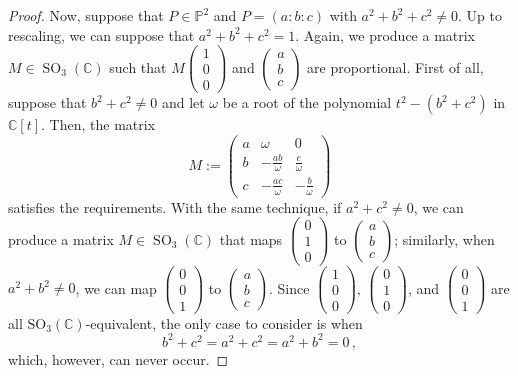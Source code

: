 \documentclass{amsart}
\theoremstyle{plain}
\theoremstyle{definition}
\newcommand{\C}{\mathbb{C}}
\newcommand{\p}{\mathbb{P}}
\newcommand{\SO}{\operatorname{SO}}
\begin{document}
\begin{proof}
Now, suppose that $P \in \p^2$ and $P = (a:b:c)$ with $a^2 + b^2 + c^2 \neq 0$.
Up to rescaling, we can suppose that $a^2 + b^2 + c^2 = 1$.
Again, we produce a matrix $M \in \SO_3(\C)$ such that $M \left(\begin{smallmatrix} 1 \\ 0 \\ 0 \end{smallmatrix}\right)$ and $\left(\begin{smallmatrix} a \\ b \\ c \end{smallmatrix}\right)$ are proportional.
First of all, suppose that $b^2 + c^2 \neq 0$ and let $\omega$ be a root of the polynomial $t^2 - (b^2 + c^2)$ in $\C[t]$.
Then, the matrix
%
\[
  M :=
  \begin{pmatrix}
    a & \omega & 0 \\
    b & -\frac{ab}{\omega} & \frac{c}{\omega} \\
    c & -\frac{ac}{\omega} & -\frac{b}{\omega}
  \end{pmatrix}
\]
%
satisfies the requirements.
With the same technique, if $a^2 + c^2 \neq 0$, we can produce a matrix $M \in \SO_3(\C)$ that maps $\left(\begin{smallmatrix} 0 \\ 1 \\ 0 \end{smallmatrix}\right)$ to $\left(\begin{smallmatrix} a \\ b \\ c \end{smallmatrix}\right)$; similarly, when $a^2 + b^2 \neq 0$, we can map $\left(\begin{smallmatrix} 0 \\ 0 \\ 1 \end{smallmatrix}\right)$ to $\left(\begin{smallmatrix} a \\ b \\ c \end{smallmatrix}\right)$.
Since $\left(\begin{smallmatrix} 1 \\ 0 \\ 0 \end{smallmatrix}\right)$, $\left(\begin{smallmatrix} 0 \\ 1 \\ 0 \end{smallmatrix}\right)$, and $\left(\begin{smallmatrix} 0 \\ 0 \\ 1 \end{smallmatrix}\right)$ are all $\mathrm{SO}_3(\C)$-equivalent, the only case to consider is when
%
\[
  b^2 + c^2 = a^2 + c^2 = a^2 + b^2 = 0 \,,
\]
%
which, however, can never occur.
\end{proof}
\end{document}
